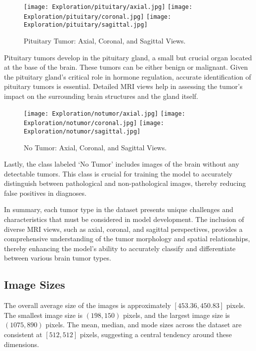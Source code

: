 \begin{figure}[H]
  \begin{center}
    \texttt{[image: Exploration/pituitary/axial.jpg]}
    \texttt{[image: Exploration/pituitary/coronal.jpg]}
    \texttt{[image: Exploration/pituitary/sagittal.jpg]}
  \end{center}
  \caption{Pituitary Tumor: Axial, Coronal, and Sagittal Views.}\label{fig:pituitary_views}
\end{figure}

Pituitary tumors develop in the pituitary gland, a small but crucial organ located at the base of the brain. These tumors can be either benign or malignant. Given the pituitary gland's critical role in hormone regulation, accurate identification of pituitary tumors is essential. Detailed MRI views help in assessing the tumor's impact on the surrounding brain structures and the gland itself.

\begin{figure}[H]
  \begin{center}
    \texttt{[image: Exploration/notumor/axial.jpg]}
    \texttt{[image: Exploration/notumor/coronal.jpg]}
    \texttt{[image: Exploration/notumor/sagittal.jpg]}
  \end{center}
  \caption{No Tumor: Axial, Coronal, and Sagittal Views.}\label{fig:notumor_views}
\end{figure}

Lastly, the class labeled `No Tumor' includes images of the brain without any detectable tumors. This class is crucial for training the model to accurately distinguish between pathological and non-pathological images, thereby reducing false positives in diagnoses.

In summary, each tumor type in the dataset presents unique challenges and characteristics that must be considered in model development. The inclusion of diverse MRI views, such as axial, coronal, and sagittal perspectives, provides a comprehensive understanding of the tumor morphology and spatial relationships, thereby enhancing the model's ability to accurately classify and differentiate between various brain tumor types.


\subsection{Image Sizes}\label{image_sizes}
The overall average size of the images is approximately $[453.36, 450.83]$ pixels. The smallest image size is $(198, 150)$ pixels, and the largest image size is $(1075, 890)$ pixels. The mean, median, and mode sizes across the dataset are consistent at $[512, 512]$ pixels, suggesting a central tendency around these dimensions.


